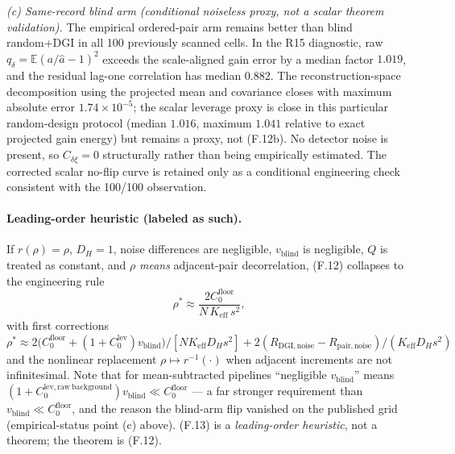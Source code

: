 \begin{statusblock}
\emph{(c) Same-record blind arm (conditional noiseless proxy, not a scalar theorem validation).} The empirical ordered-pair arm remains better than blind random+DGI in all 100 previously scanned cells. In the R15 diagnostic, raw $q_\delta=\mathbb E(a/\hat a-1)^2$ exceeds the scale-aligned gain error by a median factor $1.019$, and the residual lag-one correlation has median $0.882$. The reconstruction-space decomposition using the projected mean and covariance closes with maximum absolute error $1.74\times10^{-5}$; the scalar leverage proxy is close in this particular random-design protocol (median $1.016$, maximum $1.041$ relative to exact projected gain energy) but remains a proxy, not (F.12b). No detector noise is present, so $C_{\delta\xi}=0$ structurally rather than being empirically estimated. The corrected scalar no-flip curve is retained only as a conditional engineering check consistent with the 100/100 observation.\end{statusblock}

\paragraph{Leading-order heuristic (labeled as such).} If $r(\rho)=\rho$, $D_H=1$, noise differences are negligible, $v_{\mathrm{blind}}$ is negligible, $Q$ is treated as constant, and $\rho$ \emph{means} adjacent-pair decorrelation, (F.12) collapses to the engineering rule
\begin{equation}
\rho^*\approx\frac{2C_0^{\mathrm{floor}}}{N\,K_{\mathrm{eff}}\,s^2}, \tag{F.13}
\end{equation}
with first corrections $\rho^*\approx 2\big(C_0^{\mathrm{floor}}+(1+C_0^{\mathrm{lev}})v_{\mathrm{blind}}\big)/[NK_{\mathrm{eff}}D_Hs^2]+2(R_{\mathrm{DGI,noise}}-R_{\mathrm{pair,noise}})/(K_{\mathrm{eff}}D_Hs^2)$ and the nonlinear replacement $\rho\mapsto r^{-1}(\cdot)$ when adjacent increments are not infinitesimal. Note that for mean-subtracted pipelines ``negligible $v_{\mathrm{blind}}$'' means $(1+C_0^{\mathrm{lev,raw\ background}})v_{\mathrm{blind}}\ll C_0^{\mathrm{floor}}$ --- a far stronger requirement than $v_{\mathrm{blind}}\ll C_0^{\mathrm{floor}}$, and the reason the blind-arm flip vanished on the published grid (empirical-status point (c) above). (F.13) is a \emph{leading-order heuristic}, not a theorem; the theorem is (F.12).

